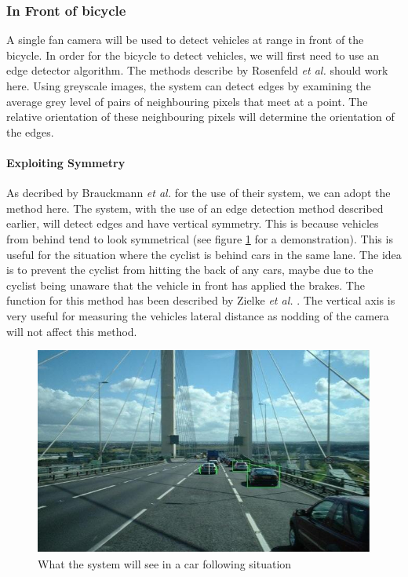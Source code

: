 \documentclass[a4paper]{report}
\begin{document}
{\subsubsection{In Front of bicycle}
A single fan camera will be used to detect vehicles at range in front of the bicycle. In order for the bicycle to detect vehicles, we will first need to use an edge detector algorithm. The methods describe by Rosenfeld \textit{et al.} \citep{edge_detection} should work here. Using greyscale images, the system can detect edges by examining the average grey level of pairs of neighbouring pixels that meet at a point. The relative orientation of these neighbouring pixels will determine the orientation of the edges.

\paragraph{Exploiting Symmetry}
As decribed by Brauckmann \textit{et al.} \citep{towards_all_around_sensing} for the use of their system, we can adopt the method here. The system, with the use of an edge detection method described earlier, will detect edges and have vertical symmetry. This is because vehicles from behind tend to look symmetrical (see figure \ref{fig:cars_follow} for a demonstration). This is useful for the situation where the cyclist is behind cars in the same lane. The idea is to prevent the cyclist from hitting the back of any cars, maybe due to the cyclist being unaware that the vehicle in front has applied the brakes. The function for this method has been described by Zielke \textit{et al.} \cite{zielke1993intensity}. The vertical axis is very useful for measuring the vehicles lateral distance as nodding of the camera will not affect this method.

\begin{figure}[H]
\centering
\includegraphics[scale=0.6]{figures/final_design/Car_follow_scenario}
\caption{What the system will see in a car following situation}
\label{fig:cars_follow}
\end{figure}

}
\end{document}
